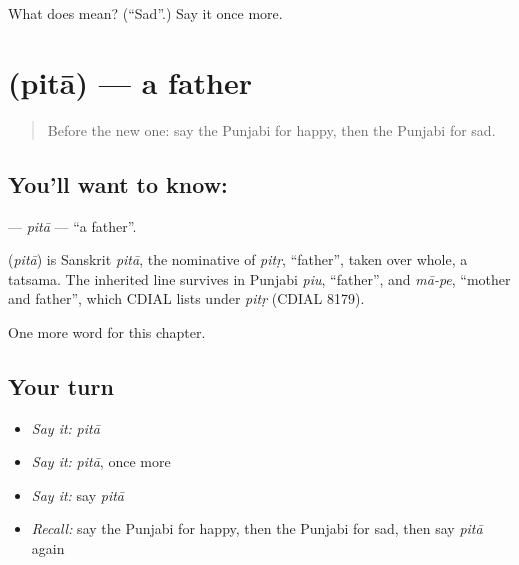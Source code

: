 \begin{tcolorbox}[breakable,colback=teal!4,colframe=teal!35!black,title={Before you move on}]
What does  mean? (\textquotedblleft{}Sad\textquotedblright{}.) Say it once more.
\end{tcolorbox}
\section[\texorpdfstring{\pa{ਪਿਤਾ} (pitā)}{ਪਿਤਾ (pitā)}]{ (pitā) — a father}

\label{lesson:PA-C53-pita}



\begin{quote}
Before the new one: say the Punjabi for happy, then the Punjabi for sad.
\end{quote}

\subsection*{You'll want to know: }
\textbf{} — \emph{pitā} — \textquotedblleft{}a father\textquotedblright{}.

\begin{cousinweb}
\textbf{} (\emph{pitā}) is Sanskrit \emph{pitā}, the nominative of \emph{pitṛ}, \textquotedblleft{}father\textquotedblright{}, taken over whole, a tatsama. The inherited line survives in Punjabi \emph{piu}, \textquotedblleft{}father\textquotedblright{}, and \emph{mā-pe}, \textquotedblleft{}mother and father\textquotedblright{}, which CDIAL lists under \emph{pitṛ} (CDIAL 8179).
\end{cousinweb}

\begin{grammarlens}[title={What you've built}]
One more word for this chapter.
\end{grammarlens}

\subsection*{Your turn}
\begin{itemize}
\raggedright
  \item \emph{Say it:} \emph{pitā}
  \item \emph{Say it:} \emph{pitā}, once more
  \item \emph{Say it:} say \emph{pitā}
  \item \emph{Recall:} say the Punjabi for happy, then the Punjabi for sad, then say \emph{pitā} again
\end{itemize}

